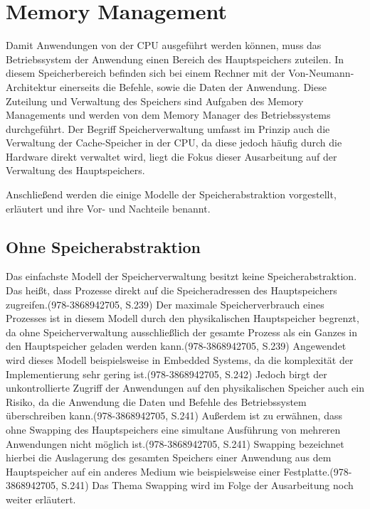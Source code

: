 \section{Memory Management}
\label{sec:MemoryManagement}
Damit Anwendungen von der CPU ausgeführt werden können, muss das Betriebssystem der Anwendung einen Bereich des Hauptspeichers zuteilen. In diesem Speicherbereich befinden sich bei einem Rechner mit der Von-Neumann-Architektur einerseits die Befehle, sowie die Daten der Anwendung. Diese Zuteilung und Verwaltung des Speichers sind Aufgaben des Memory Managements und werden von dem Memory Manager des Betriebssystems durchgeführt. Der Begriff Speicherverwaltung umfasst im Prinzip auch die Verwaltung der Cache-Speicher in der CPU, da diese jedoch häufig durch die Hardware direkt verwaltet wird, liegt die Fokus dieser Ausarbeitung auf der Verwaltung des Hauptspeichers.

Anschließend werden die einige Modelle der Speicherabstraktion vorgestellt, erläutert und ihre Vor- und Nachteile benannt.

\subsection{Ohne Speicherabstraktion}
\label{subsec:OhneSpeicherabstraktion}
Das einfachste Modell der Speicherverwaltung besitzt keine Speicherabstraktion. Das heißt, dass Prozesse direkt auf die Speicheradressen des Hauptspeichers zugreifen.(978-3868942705, S.239) Der maximale Speicherverbrauch eines Prozesses ist in diesem Modell durch den physikalischen Hauptspeicher begrenzt, da ohne Speicherverwaltung ausschließlich der gesamte Prozess als ein Ganzes in den Hauptspeicher geladen werden kann.(978-3868942705, S.239) Angewendet wird dieses Modell beispielsweise in Embedded Systems, da die komplexität der Implementierung sehr gering ist.(978-3868942705, S.242) Jedoch birgt der unkontrollierte Zugriff der Anwendungen auf den physikalischen Speicher auch ein Risiko, da die Anwendung die Daten und Befehle des Betriebssystem überschreiben kann.(978-3868942705, S.241) Außerdem ist zu erwähnen, dass ohne Swapping des Hauptspeichers eine simultane  Ausführung von mehreren Anwendungen nicht möglich ist.(978-3868942705, S.241) Swapping bezeichnet hierbei die Auslagerung des gesamten Speichers einer Anwendung aus dem Hauptspeicher auf ein anderes Medium wie beispielsweise einer Festplatte.(978-3868942705, S.241) Das Thema Swapping wird im Folge der Ausarbeitung noch weiter erläutert.

